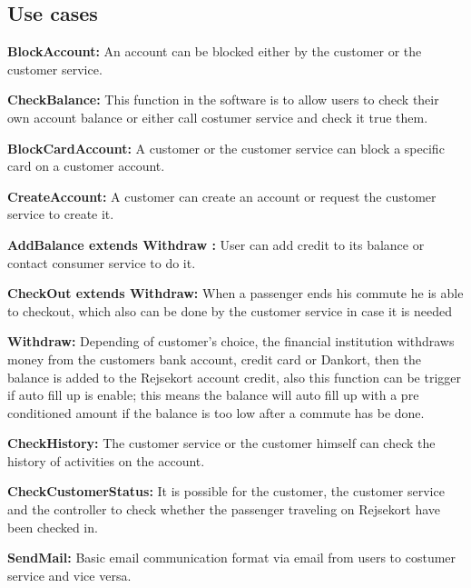 \subsection*{Use cases}
\textbf{BlockAccount:}
An account can be blocked either by the customer or the customer service.

\textbf{CheckBalance:}
This function in the software is to allow users to check their own account balance or either call costumer service and check it true them.

\textbf{BlockCardAccount:}
A customer or the customer service can block a specific card on a customer account.

\textbf{CreateAccount:}
A customer can create an account or request the customer service to create it.

\textbf{AddBalance extends Withdraw :}
User can add credit to its balance or contact consumer service to do it.

\textbf{CheckOut extends Withdraw:}
When a passenger ends his commute he is able to checkout, which also can be done by the customer service in case it is needed

\textbf{Withdraw:}
Depending of customer's choice, the financial institution withdraws money from the customers bank account, credit card or Dankort, then the balance is added to the Rejsekort account credit, also this function can be trigger if auto fill up is enable; this means the balance will auto fill up with a pre conditioned amount if the balance is too low after a commute has be done.

\textbf{CheckHistory:}
The customer service or the customer himself can check the history of activities on the account.

\textbf{CheckCustomerStatus:}
It is possible for the customer, the customer service and the controller to check whether the passenger traveling on Rejsekort have been checked in.

\textbf{SendMail:}
Basic email communication format via email from users to costumer service and vice versa.

